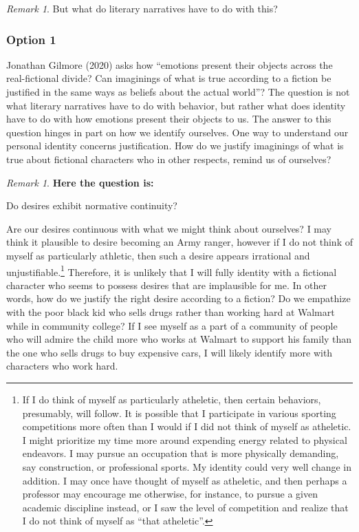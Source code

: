 \documentclass[12pt]{book}
\theoremstyle{definition}
\theoremstyle{remark}
\newtheorem{remark}[theorem]{Remark}
\begin{document}
\begin{remark}
But what do literary narratives have to do with this?
\end{remark}

\subsubsection*{Option 1}\label{option-1}

Jonathan Gilmore (2020) asks how ``emotions present their objects across the real-fictional divide? Can imaginings of what is true according to a fiction be justified in the same ways as beliefs about the actual world''? The question is not what literary narratives have to do with behavior, but rather what does identity have to do with how emotions present their objects to us. The answer to this question hinges in part on how we identify ourselves. One way to understand our personal identity concerns justification. How do we justify imaginings of what is true about fictional characters who in other respects, remind us of ourselves?

\begin{remark}
\textbf{Here the question is:}

Do desires exhibit normative continuity?
\end{remark}

Are our desires continuous with what we might think about ourselves? I may think it plausible to desire becoming an Army ranger, however if I do not think of myself as particularly athletic, then such a desire appears irrational and unjustifiable.\footnote{If I do think of myself as particularly atheletic, then certain behaviors, presumably, will follow. It is possible that I participate in various sporting competitions more often than I would if I did not think of myself as atheletic. I might prioritize my time more around expending energy related to physical endeavors. I may pursue an occupation that is more physically demanding, say construction, or professional sports. My identity could very well change in addition. I may once have thought of myself as atheletic, and then perhaps a professor may encourage me otherwise, for instance, to pursue a given academic discipline instead, or I saw the level of competition and realize that I do not think of myself as ``that atheletic''.} Therefore, it is unlikely that I will fully identity with a fictional character who seems to possess desires that are implausible for me. In other words, how do we justify the right desire according to a fiction? Do we empathize with the poor black kid who sells drugs rather than working hard at Walmart while in community college? If I see myself as a part of a community of people who will admire the child more who works at Walmart to support his family than the one who sells drugs to buy expensive cars, I will likely identify more with characters who work hard.
\end{document}
